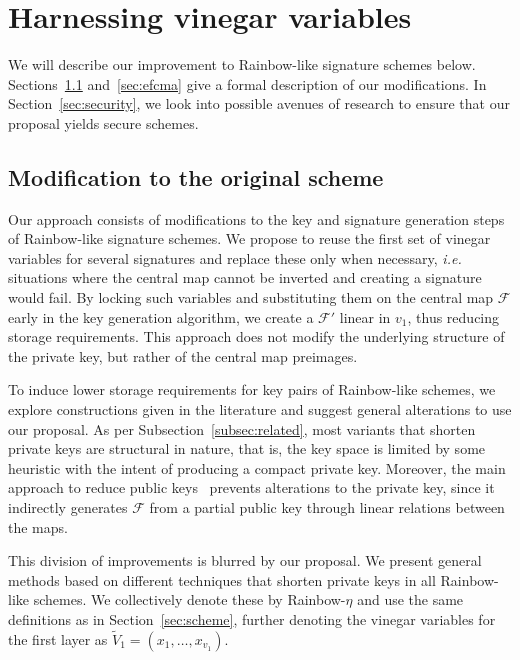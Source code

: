 \documentclass[openright, draft, 10pt]{report}
\begin{document}

\chapter{Harnessing vinegar variables}

We will describe our improvement to Rainbow-like signature schemes below.
Sections~\ref{sec:mod} and~\ref{sec:efcma} give a formal description
of our modifications. In Section~\ref{sec:security}, we look into 
possible avenues of research to ensure that our proposal yields secure
schemes.

\section{Modification to the original scheme}\label{sec:mod}

Our approach consists of modifications to the key and signature generation
steps of Rainbow-like signature schemes. We propose to reuse the first set of
vinegar variables for several signatures and replace these only when necessary,
\emph{i.e.} situations where the central map cannot be inverted and creating a
signature would fail. By locking such variables and substituting them on the
central map $\mathcal{F}$ early in the key generation algorithm, we create a
$\mathcal{F}'$ linear in $v_{1}$, thus reducing storage requirements. This
approach does not modify the underlying structure of the private key, but
rather of the central map preimages.

To induce lower storage requirements for key pairs of Rainbow-like schemes, we
explore constructions given in the literature and suggest general alterations
to use our proposal. As per Subsection~\ref{subsec:related}, most variants that
shorten private keys are structural in nature, that is, the key space is
limited by some heuristic with the intent of producing a compact private key.
Moreover, the main approach to reduce public keys~\cite{Petzoldt:201307:phd}
prevents alterations to the private key,
since it indirectly generates $\mathcal{F}$ from a partial public key through
linear relations between the maps.

This division of improvements is blurred by our proposal. We present general
methods based on different techniques that shorten private keys in all
Rainbow-like schemes. We collectively denote these by Rainbow-$\eta$ and use
the same definitions as in Section~\ref{sec:scheme}, further denoting
the vinegar variables for the first layer as
$\widetilde{V}_{1} = (x_{1}, \dots, x_{v_{1}})$.
\end{document}
